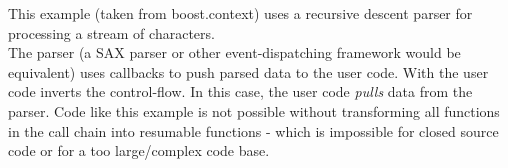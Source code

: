 \label{appendix}
This example (taken from boost.context\cite{bcontext}) uses a recursive descent
parser for processing a stream of characters.\\
The parser (a SAX parser or other event-dispatching framework would be
equivalent) uses callbacks to push parsed data to the user code. With \ectx the
user code inverts the control-flow. In this case, the user code \emph{pulls}
data from the parser.
Code like this example is not possible without transforming all functions in the
call chain into resumable functions - which is impossible for closed source code
or for a too large/complex code base.
